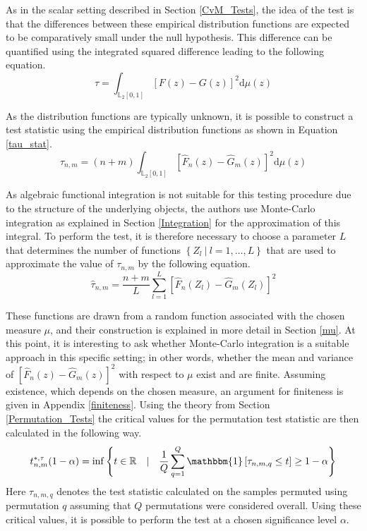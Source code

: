 \documentclass[12pt, a4paper]{article}
\theoremstyle{MAstyle} \newtheorem{assumption}{Assumption}[section]
\theoremstyle{MAstyle} \newtheorem{definition}{Definition}[section]
\theoremstyle{MAstyle} \newtheorem{theorem}{Theorem}[section]
\begin{document}
			As in the scalar setting described in Section \ref{CvM_Tests}, the idea of the test is that the differences between these empirical distribution functions are expected to be comparatively small under the null hypothesis. This difference can be quantified using the integrated squared difference leading to the following equation.
			\begin{equation}
				\tau = \int_{\mathbb{L}_2[0,1]}\left[F(z) - G(z)\right]^2 \mathrm{d} \mu(z)
			\end{equation}
			
			As the distribution functions are typically unknown, it is possible to construct a test statistic using the empirical distribution functions as shown in Equation \ref{tau_stat}.
			\begin{equation}\label{tau_stat}
				\tau_{n,m} = (n+m) \int_{\mathbb{L}_2[0,1]}\left[\hat{F}_n(z) - \hat{G}_m(z)\right]^2 \mathrm{d} \mu(z)
			\end{equation}
		
			As algebraic functional integration is not suitable for this testing procedure due to the structure of the underlying objects, the authors use Monte-Carlo integration as explained in Section \ref{Integration} for the approximation of this integral. To perform the test, it is therefore necessary to choose a parameter $L$ that determines the number of functions $\left\{Z_l \ \vert \ l = 1, \dots, L\right\}$ that are used to approximate the value of $\tau_{n,m}$ by the following equation.
			\begin{equation}\label{tau_hat}
				\hat{\tau}_{n,m} = \frac{n+m}{L} \sum_{l = 1}^{L} \left[\hat{F}_n(Z_l) - \hat{G}_m(Z_l)\right]^2
			\end{equation}
		
			These functions are drawn from a random function associated with the chosen measure $\mu$, and their construction is explained in more detail in Section \ref{mu}. At this point, it is interesting to ask whether Monte-Carlo integration is a suitable approach in this specific setting; in other words, whether the mean and variance of $\left[\hat{F}_n(z) - \hat{G}_m(z)\right]^2$ with respect to $\mu$ exist and are finite.
			Assuming existence, which depends on the chosen measure, an argument for finiteness is given in Appendix \ref{finiteness}.
			Using the theory from Section \ref{Permutation_Tests} the critical values for the permutation test statistic are then calculated in the following way. 
			\begin{equation}
				t^{*, \tau}_{n,m}(1-\alpha) = \inf \left\{t \in \mathbb{R} \quad \vert \quad \frac{1}{Q} \sum_{q = 1}^{Q} \mathbbm{1}\left[\tau_{n,m,q} \leq t\right] \geq 1 - \alpha \right\}
			\end{equation}
			Here $\tau_{n,m,q}$ denotes the test statistic calculated on the samples permuted using permutation $q$ assuming that $Q$ permutations were considered overall. Using these critical values, it is possible to perform the test at a chosen significance level $\alpha$.
		
\end{document}
